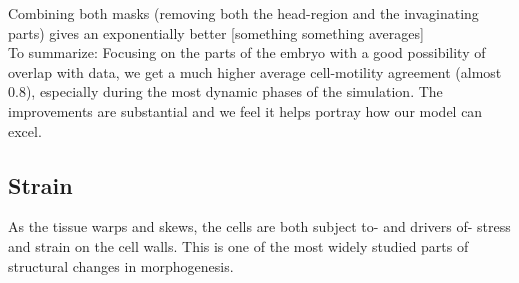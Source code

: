 Combining both masks (removing both the head-region and the  invaginating parts) gives an exponentially better [something something averages] \\


To summarize: Focusing on the parts of the embryo with a good possibility of overlap with data, we get a much higher average cell-motility agreement (almost 0.8), especially during the most dynamic phases of the simulation. The improvements are substantial and we feel it helps portray how our model can excel.




\subsection{Strain}
As the tissue warps and skews, the cells are both subject to- and drivers of- stress and strain on the cell walls. This is one of the most widely studied parts of structural changes in morphogenesis.

